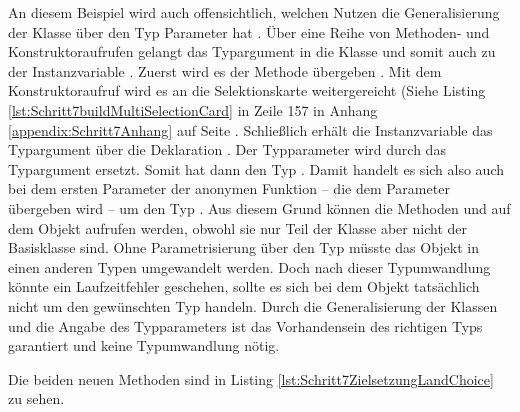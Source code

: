 An diesem Beispiel wird auch offensichtlich,
welchen Nutzen die Generalisierung der Klasse  über den Typ Parameter  hat .
Über eine Reihe von Methoden- und Konstruktoraufrufen gelangt das Typargument  in die Klasse  und somit auch zu der Instanzvariable . Zuerst wird es der Methode  übergeben . 
Mit dem Konstruktoraufruf  wird es an die Selektionskarte weitergereicht (Siehe Listing \ref{lst:Schritt7buildMultiSelectionCard} in Zeile 157 in Anhang \ref{appendix:Schritt7Anhang} auf Seite \pageref{lst:Schritt7buildMultiSelectionCard}.
Schließlich erhält die Instanzvariable das Typargument über die Deklaration  . Der Typparameter wird durch das Typargument ersetzt. Somit hat  dann den Typ .
Damit handelt es sich also auch bei dem ersten Parameter  der anonymen Funktion --
die dem Parameter  übergeben wird  -- um den Typ .
Aus diesem Grund können die Methoden   und   auf dem Objekt  aufrufen werden,
obwohl sie nur Teil der Klasse  aber nicht der Basisklasse  sind.
Ohne Parametrisierung über den Typ müsste das Objekt  in einen anderen Typen umgewandelt werden.
Doch nach dieser Typumwandlung könnte ein Laufzeitfehler geschehen, sollte es sich bei dem Objekt tatsächlich nicht um den gewünschten Typ handeln.
Durch die Generalisierung der Klassen und die Angabe des Typparameters ist das Vorhandensein des richtigen Typs garantiert und keine Typumwandlung nötig.

Die beiden neuen Methoden sind in Listing \ref{lst:Schritt7ZielsetzungLandChoice} zu sehen.


